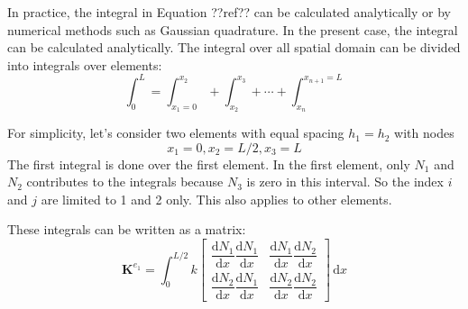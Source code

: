 \documentclass[a4paper,12pt]{article} %
\begin{document}
In practice, the integral in Equation ??ref?? can be calculated analytically or
by numerical methods such as Gaussian quadrature.
In the present case, the integral can be calculated analytically.
The integral over all spatial
domain can be divided into integrals over elements:
\begin{equation}
\int_{0}^{L} = \int_{x_{1}=0}^{x_{2}} + \int_{x_{2}}^{x_{3}} + \cdots +
\int_{x_{n}}^{x_{n+1}=L}
\end{equation}

For simplicity, let's consider two elements with equal spacing
$h_{1} = h_{2}$ with nodes
\begin{equation}
x_{1} = 0, x_{2} = L/2, x_{3} = L
\end{equation}
The first integral is done over the first element. In the first element, only
$N_{1}$ and $N_{2}$ contributes to the integrals because $N_{3}$ is zero in
this interval. So the index $i$ and $j$ are limited to 1 and 2 only.
This also applies to other elements.

These integrals can be written as a matrix:
\begin{equation}
\mathbf{K}^{e_{1}} = \int_{0}^{L/2} k \begin{bmatrix}
\dfrac{\mathrm{d}N_{1}}{\mathrm{d}x} \dfrac{\mathrm{d}N_{1}}{\mathrm{d}x} &
\dfrac{\mathrm{d}N_{1}}{\mathrm{d}x} \dfrac{\mathrm{d}N_{2}}{\mathrm{d}x} \\[10pt]
\dfrac{\mathrm{d}N_{2}}{\mathrm{d}x} \dfrac{\mathrm{d}N_{1}}{\mathrm{d}x} &
\dfrac{\mathrm{d}N_{2}}{\mathrm{d}x} \dfrac{\mathrm{d}N_{2}}{\mathrm{d}x}
\end{bmatrix}\,\mathrm{d}x
\end{equation}
\end{document}
